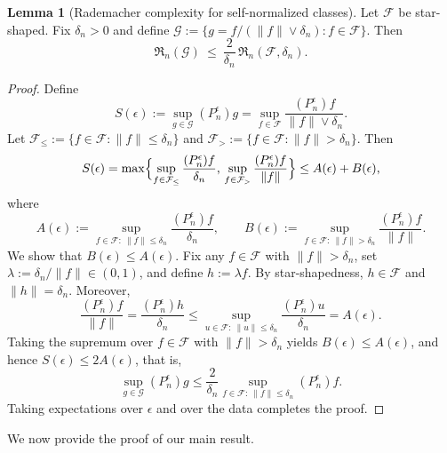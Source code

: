 \documentclass[11pt]{article}
\theoremstyle{plain}
\theoremstyle{definition} %
\newtheorem{lemma}{Lemma}
\begin{document}
\begin{lemma}[Rademacher complexity for self-normalized classes]\label{lem:self_normalize_rad}
Let $\mathcal{F}$ be star-shaped. Fix $\delta_n>0$ and define $\mathcal{G}:=\bigl\{g=f/(\|f\|\vee \delta_n): f\in\mathcal{F}\bigr\}$. Then
\[
\mathfrak{R}_n(\mathcal{G})
\ \le\
\frac{2}{\delta_n}\,\mathfrak{R}_n(\mathcal{F},\delta_n).
\]
\end{lemma}
\begin{proof}
Define
\[
S(\epsilon)
:=
\sup_{g\in\mathcal{G}} (P_n^\epsilon)g
=
\sup_{f\in\mathcal{F}} \frac{(P_n^\epsilon)f}{\|f\|\vee \delta_n}.
\]
Let $\mathcal{F}_{\le}:=\{f\in\mathcal{F}:\|f\|\le \delta_n\}$ and
$\mathcal{F}_{>}:=\{f\in\mathcal{F}:\|f\|>\delta_n\}$. Then
\[
S(\epsilon)
=
\max\Bigl\{
\sup_{f\in\mathcal{F}_{\le}}\frac{(P_n^\epsilon)f}{\delta_n},\,
\sup_{f\in\mathcal{F}_{>}}\frac{(P_n^\epsilon)f}{\|f\|}
\Bigr\}
\le A(\epsilon)+B(\epsilon),
\]
where
\[
A(\epsilon):=\sup_{f\in\mathcal{F}:\ \|f\|\le \delta_n}\frac{(P_n^\epsilon)f}{\delta_n},
\qquad
B(\epsilon):=\sup_{f\in\mathcal{F}:\ \|f\|>\delta_n}\frac{(P_n^\epsilon)f}{\|f\|}.
\]
We show that $B(\epsilon)\le A(\epsilon)$. Fix any $f\in\mathcal{F}$ with
$\|f\|>\delta_n$, set $\lambda:=\delta_n/\|f\|\in(0,1)$, and define $h:=\lambda f$.
By star-shapedness, $h\in\mathcal{F}$ and $\|h\|=\delta_n$. Moreover,
\[
\frac{(P_n^\epsilon)f}{\|f\|}
=
\frac{(P_n^\epsilon)h}{\delta_n}
\le
\sup_{u\in\mathcal{F}:\ \|u\|\le \delta_n}\frac{(P_n^\epsilon)u}{\delta_n}
=
A(\epsilon).
\]
Taking the supremum over $f\in\mathcal{F}$ with $\|f\|>\delta_n$ yields
$B(\epsilon)\le A(\epsilon)$, and hence $S(\epsilon)\le 2A(\epsilon)$, that is,
\[
\sup_{g\in\mathcal{G}} (P_n^\epsilon)g
\le
\frac{2}{\delta_n}\sup_{f\in\mathcal{F}:\ \|f\|\le \delta_n}(P_n^\epsilon)f.
\]
Taking expectations over $\epsilon$ and over the data completes the proof.
\end{proof}


 


We now provide the proof of our main result.
\end{document}
